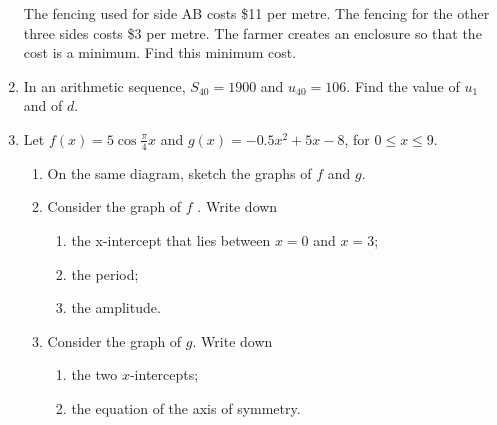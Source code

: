 \documentclass[12pt, twoside]{article}
\begin{document}
\begin{enumerate}
\begin{figure}[!htbp]
\begin{center}
\begin{tikzpicture}
  \end{tikzpicture}
  \end{center}
  \end{figure}

  The fencing used for side AB costs \$11 per metre. The fencing for the other three sides costs \$3 per metre. The farmer creates an enclosure so that the cost is a minimum. Find this minimum cost.

\item In an arithmetic sequence, $S_{40} =1900$ and $u_{40} =106$. Find the value of $u_1$ and of $d$.

\newpage

\item Let $\displaystyle f(x) = 5 \cos \frac{\pi}{4} x$ and $g(x)= -0.5 x^2 +5x-8$, for $0 \leq x \leq 9$.
  \begin{enumerate}
    \item On the same diagram, sketch the graphs of $f$ and $g$.
    \item Consider the graph of $f$ . Write down
      \begin{enumerate}
      \item the x-intercept that lies between $x = 0$ and $x = 3$;
      \item the period;
      \item the amplitude.
      \end{enumerate}
    \item Consider the graph of $g$. Write down
      \begin{enumerate}
      \item the two $x$-intercepts;
      \item the equation of the axis of symmetry.
      \end{enumerate}
  \end{enumerate}

\end{enumerate}

  \begin{figure}[!htbp]
  \begin{center}
  \end{center}
  \end{figure}
\end{document}
